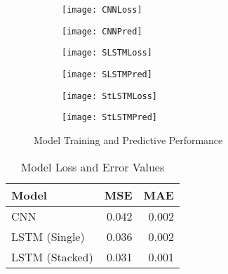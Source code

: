 ﻿\documentclass{article}
\begin{document}
  \begin{figure}[!htb]
    \begin{subfigure}{.5\textwidth}
      \centering
      \texttt{[image: CNNLoss]}
      \label{fig:sfig1}
    \end{subfigure}
    \begin{subfigure}{.5\textwidth}
      \centering
      \texttt{[image: CNNPred]}
      \label{fig:sfig2}
    \end{subfigure}
    \begin{subfigure}{.5\textwidth}
      \centering
      \texttt{[image: SLSTMLoss]}
      \label{fig:sfig3}
    \end{subfigure}
    \begin{subfigure}{.5\textwidth}
      \centering
      \texttt{[image: SLSTMPred]}
      \label{fig:sfig4}
    \end{subfigure}
    \begin{subfigure}{.5\textwidth}
      \centering
      \texttt{[image: StLSTMLoss]}
      \label{fig:sfig5}
    \end{subfigure}
    \begin{subfigure}{.5\textwidth}
      \centering
      \texttt{[image: StLSTMPred]}
      \label{fig:sfig6}
    \end{subfigure}
    \caption{Model Training and Predictive Performance}
    \label{fig:fig1}
  \end{figure}

  \begin{table}[h!]
  \begin{centering}
  \begin{tabular}{l | r | r }
    
    Model & MSE & MAE \\
    \hline
    CNN & 0.042 & 0.002 \\
    
    LSTM (Single) & 0.036 & 0.002 \\
    
    LSTM (Stacked) & 0.031 & 0.001
                               
  \end{tabular}
  \caption{Model Loss and Error Values}
  \label{table:1}
  \end{centering}
\end{table}
\end{document}

